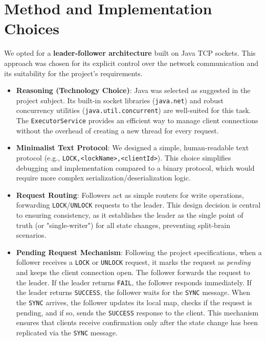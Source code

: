 \documentclass[a4paper,11pt]{article}
\begin{document}
\section{Method and Implementation Choices}
We opted for a \textbf{leader-follower architecture} built on Java TCP sockets. This approach was chosen for its explicit control over the network communication and its suitability for the project's requirements.

\begin{itemize}
    \item \textbf{Reasoning (Technology Choice)}: Java was selected as suggested in the project subject. Its built-in socket libraries (\texttt{java.net}) and robust concurrency utilities (\texttt{java.util.concurrent}) are well-suited for this task. The \texttt{ExecutorService} provides an efficient way to manage client connections without the overhead of creating a new thread for every request.

    \item \textbf{Minimalist Text Protocol}: We designed a simple, human-readable text protocol (e.g., \texttt{LOCK,<lockName>,<clientId>}). This choice simplifies debugging and implementation compared to a binary protocol, which would require more complex serialization/deserialization logic.

    \item \textbf{Request Routing}: Followers act as simple routers for write operations, forwarding \texttt{LOCK}/\texttt{UNLOCK} requests to the leader. This design decision is central to ensuring consistency, as it establishes the leader as the single point of truth (or "single-writer") for all state changes, preventing split-brain scenarios.

    \item \textbf{Pending Request Mechanism}: Following the project specifications, when a follower receives a \texttt{LOCK} or \texttt{UNLOCK} request, it marks the request as \emph{pending} and keeps the client connection open. The follower forwards the request to the leader. If the leader returns \texttt{FAIL}, the follower responds immediately. If the leader returns \texttt{SUCCESS}, the follower waits for the \texttt{SYNC} message. When the \texttt{SYNC} arrives, the follower updates its local map, checks if the request is pending, and if so, sends the \texttt{SUCCESS} response to the client. This mechanism ensures that clients receive confirmation only after the state change has been replicated via the \texttt{SYNC} message.
    

\end{itemize}
\end{document}
